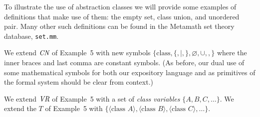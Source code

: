 To illustrate the use of abstraction classes we will provide some examples
of definitions that make use of them:  the empty set, class union, and
unordered pair.  Many other such definitions can be found in the
Metamath set theory database,
\texttt{set.mm}.

We extend $\mbox{\em CN}$ of Example~5 with new symbols $\{\mbox{class}, \{,
|, \}, \varnothing, \cup, , \}$ where the inner braces and last comma are
constant symbols. (As before,
our dual use of some mathematical symbols for both our expository
language and as primitives of the formal system should be clear from context.)

We extend $\mbox{\em VR}$ of Example~5 with a set of {\em class
variables}
$\{A,B,C,\ldots\}$. We extend the $T$ of Example~5 with $\{\langle
\mbox{class\ } A\rangle, \langle \mbox{class\ }B\rangle, \langle \mbox{class\ }
C\rangle,\ldots\}$.

